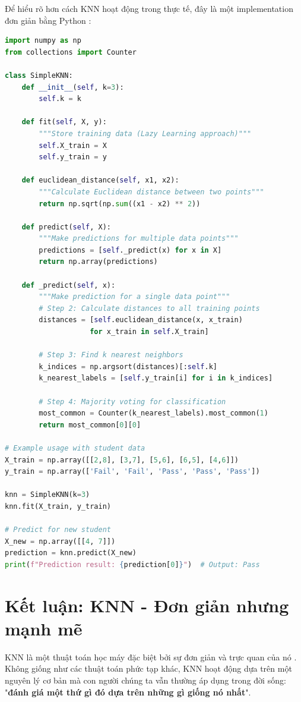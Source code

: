 Để hiểu rõ hơn cách KNN hoạt động trong thực tế, đây là một implementation đơn giản bằng Python \cite{sklearn_knn}:

\begin{lstlisting}[language=Python, caption={Simple implementation of KNN algorithm}]
import numpy as np
from collections import Counter

class SimpleKNN:
    def __init__(self, k=3):
        self.k = k
    
    def fit(self, X, y):
        """Store training data (Lazy Learning approach)"""
        self.X_train = X
        self.y_train = y
    
    def euclidean_distance(self, x1, x2):
        """Calculate Euclidean distance between two points"""
        return np.sqrt(np.sum((x1 - x2) ** 2))
    
    def predict(self, X):
        """Make predictions for multiple data points"""
        predictions = [self._predict(x) for x in X]
        return np.array(predictions)
    
    def _predict(self, x):
        """Make prediction for a single data point"""
        # Step 2: Calculate distances to all training points
        distances = [self.euclidean_distance(x, x_train) 
                    for x_train in self.X_train]
        
        # Step 3: Find k nearest neighbors
        k_indices = np.argsort(distances)[:self.k]
        k_nearest_labels = [self.y_train[i] for i in k_indices]
        
        # Step 4: Majority voting for classification
        most_common = Counter(k_nearest_labels).most_common(1)
        return most_common[0][0]

# Example usage with student data
X_train = np.array([[2,8], [3,7], [5,6], [6,5], [4,6]])
y_train = np.array(['Fail', 'Fail', 'Pass', 'Pass', 'Pass'])

knn = SimpleKNN(k=3)
knn.fit(X_train, y_train)

# Predict for new student
X_new = np.array([[4, 7]])
prediction = knn.predict(X_new)
print(f"Prediction result: {prediction[0]}")  # Output: Pass
\end{lstlisting}

\section{Kết luận: KNN - Đơn giản nhưng mạnh mẽ}

KNN là một thuật toán học máy đặc biệt bởi sự đơn giản và trực quan của nó \cite{hastie2009elements}. Không giống như các thuật toán phức tạp khác, KNN hoạt động dựa trên một nguyên lý cơ bản mà con người chúng ta vẫn thường áp dụng trong đời sống: "\textbf{đánh giá một thứ gì đó dựa trên những gì giống nó nhất}".

